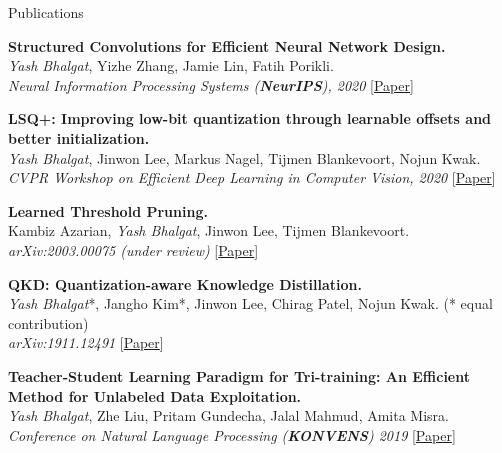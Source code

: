 \documentclass{resume} %
\begin{document}
\begin{rSection}{Publications}
\vspace*{-0.2cm}
\begin{etaremune}[leftmargin=14pt] \itemsep 10pt
    \item \textbf{Structured Convolutions for Efficient Neural Network Design.}
    \\ {\it Yash Bhalgat}, Yizhe Zhang, Jamie Lin, Fatih Porikli.
    \\ \textit{Neural Information Processing Systems (\textbf{NeurIPS}), 2020} [\href{https://arxiv.org/pdf/2008.02454.pdf}{Paper}]
    \vspace{-8pt}
    \item \textbf{LSQ+: Improving low-bit quantization through learnable offsets and better initialization.} 
    \\ {\it Yash Bhalgat}, Jinwon Lee, Markus Nagel, Tijmen Blankevoort, Nojun Kwak. 
    \\ \textit{CVPR Workshop on Efficient Deep Learning in Computer Vision, 2020} [\href{http://openaccess.thecvf.com/content_CVPRW_2020/html/w40/Bhalgat_LSQ_Improving_Low-Bit_Quantization_Through_Learnable_Offsets_and_Better_Initialization_CVPRW_2020_paper.html}{Paper}]
    \vspace{-8pt}
    \item \textbf{Learned Threshold Pruning.}
    \\ Kambiz Azarian, {\it Yash Bhalgat}, Jinwon Lee, Tijmen Blankevoort. 
    \\ \textit{arXiv:2003.00075 (under review)} [\href{https://arxiv.org/pdf/2003.00075.pdf}{Paper}]
    \vspace{-8pt}
    \item \textbf{QKD: Quantization-aware Knowledge Distillation.}
    \\ {\it Yash Bhalgat}*, Jangho Kim*, Jinwon Lee, Chirag Patel, Nojun Kwak. (* equal contribution)
    \\ \textit{arXiv:1911.12491} [\href{https://arxiv.org/abs/1911.12491}{Paper}]
     \vspace{-8pt}
    \item {\textbf{Teacher-Student Learning Paradigm for Tri-training: An Efficient Method for Unlabeled Data Exploitation.} 
    \\ {\it Yash Bhalgat}, Zhe Liu, Pritam Gundecha, Jalal Mahmud, Amita Misra. 
    \\ \textit{Conference on Natural Language Processing (\textbf{KONVENS}) 2019}} [\href{https://arxiv.org/abs/1909.11233}{Paper}]

\end{etaremune}
\end{rSection}
\end{document}
